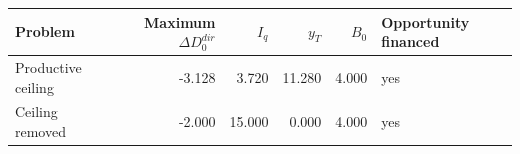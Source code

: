 \begin{tabular}{@{}lrrrrl@{}}
\toprule
Problem & Maximum $\Delta D_0^{dir}$ & $I_q$ & $y_T$ & $B_0$ & Opportunity financed \\
\midrule
Productive ceiling & -3.128 & 3.720 & 11.280 & 4.000 & yes \\
Ceiling removed & -2.000 & 15.000 & 0.000 & 4.000 & yes \\
\bottomrule
\end{tabular}
